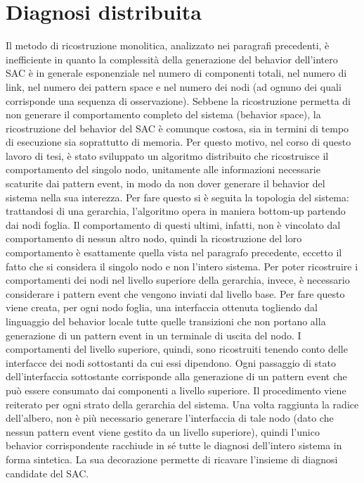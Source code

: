 \newpage
\section{Diagnosi distribuita}
Il metodo di ricostruzione monolitica, analizzato nei paragrafi precedenti, è inefficiente in quanto la complessità della generazione del behavior dell'intero SAC è in generale esponenziale nel numero di componenti totali, nel numero di link, nel numero dei pattern space e nel numero dei nodi (ad ognuno dei quali corrisponde una sequenza di osservazione). Sebbene la ricostruzione permetta di non generare il comportamento completo del sistema (behavior space), la ricostruzione del behavior del SAC è comunque costosa, sia in termini di tempo di esecuzione sia soprattutto di memoria.
Per questo motivo, nel corso di questo lavoro di tesi, è stato sviluppato un algoritmo distribuito che ricostruisce il comportamento del singolo nodo, unitamente alle informazioni necessarie scaturite dai pattern event, in modo da non dover generare il behavior del sistema nella sua interezza. Per fare questo si è seguita la topologia del sistema: trattandosi di una gerarchia, l'algoritmo opera in maniera bottom-up partendo dai nodi foglia. Il comportamento di questi ultimi, infatti, non è vincolato dal comportamento di nessun altro nodo, quindi la ricostruzione del loro comportamento è esattamente quella vista nel paragrafo precedente, eccetto il fatto che si considera il singolo nodo e non l'intero sistema. Per poter ricostruire i comportamenti dei nodi nel livello superiore della gerarchia, invece, è necessario considerare i pattern event che vengono inviati dal livello base. Per fare questo viene creata, per ogni nodo foglia, una interfaccia ottenuta togliendo dal linguaggio del behavior locale tutte quelle transizioni che non portano alla generazione di un pattern event in un terminale di uscita del nodo. I comportamenti del livello superiore, quindi, sono ricostruiti tenendo conto delle interfacce dei nodi sottostanti da cui essi dipendono. Ogni passaggio di stato dell'interfaccia sottostante corrisponde alla generazione di un pattern event che può essere consumato dai componenti a livello superiore. Il procedimento viene reiterato per ogni strato della gerarchia del sistema.
Una volta raggiunta la radice dell'albero, non è più necessario generare l'interfaccia di tale nodo (dato che nessun pattern event viene gestito da un livello superiore), quindi l'unico behavior corrispondente racchiude in sé tutte le diagnosi dell'intero sistema in forma sintetica. La sua decorazione permette di ricavare l'insieme di diagnosi candidate del SAC.

